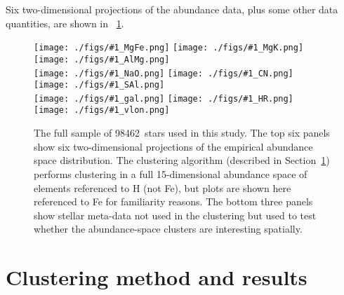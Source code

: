 \documentclass[12pt, letterpaper, preprint]{aastex}
\newcommand{\project}[1]{\textsl{#1}}
\newcommand{\thecannon}{\project{The~Cannon}}
\newcommand{\documentname}{\textsl{Article}}
\newcommand{\sectionname}{Section}
\newcommand{\teff}{T_{\mathrm{eff}}}
\newcommand{\logg}{\log g}
\newlength{\figwidth}\setlength{\figwidth}{0.3\textwidth}
\newcommand{\insanefigure}[1]{%
\texttt{[image: ./figs/\#1\_MgFe.png]}%
\texttt{[image: ./figs/\#1\_MgK.png]}%
\texttt{[image: ./figs/\#1\_AlMg.png]}\\
\texttt{[image: ./figs/\#1\_NaO.png]}%
\texttt{[image: ./figs/\#1\_CN.png]}%
\texttt{[image: ./figs/\#1\_SAl.png]}\\
\texttt{[image: ./figs/\#1\_gal.png]}%
\texttt{[image: ./figs/\#1\_HR.png]}\\
\texttt{[image: ./figs/\#1\_vlon.png]}}
\newcommand{\totalnumber}{98462} %
\begin{document}


Six two-dimensional projections of the abundance data, plus some other
data quantities, are shown in \figurename~\ref{fig:all}.

\begin{figure}[!p]
\insanefigure{all}
\caption{The full sample of \totalnumber\ stars used in this study.
  The top six panels show six two-dimensional projections of the
  empirical abundance space distribution.
  The clustering algorithm (described in
  \sectionname~\ref{sec:method}) performs clustering in a full
  15-dimensional abundance space of elements referenced to H (not Fe),
  but plots are shown here referenced to Fe for familiarity reasons.
  The bottom three panels show stellar meta-data not used in the
  clustering but used to test whether the abundance-space clusters
  are interesting spatially.\label{fig:all}}
\end{figure}

\clearpage
\section{Clustering method and results}\label{sec:method}
\end{document}
